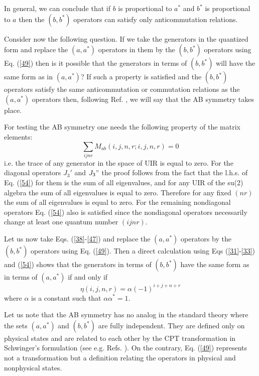 \documentclass[a4paper,12pt]{article}%
\begin{document}
In general, we can conclude that if $b$ is proportional
to $a^*$ and $b^*$ is proportional to $a$ then the
$(b,b^*)$ operators can satisfy only anticommutation
relations.

Consider now the following question. If we take the
generators in the quantized form and 
replace the $(a,a^*)$ operators in them by the
$(b,b^*)$ operators using Eq. (\ref{49}) then is
it possible that the generators in terms of
$(b,b^*)$ will have the same form as in $(a,a^*)$?
If such a property is satisfied and the 
$(b,b^*)$ operators satisfy the same anticommutation 
or commutation relations as the $(a,a^*)$ operators 
then, following Ref. \cite{lev2}, we will say that 
the AB symmetry takes place.

For testing the AB symmetry one needs the following
property of the matrix elements:
\begin{equation}
\sum_{ijnr} M_{ab}(i,j,n,r;i,j,n,r)=0
\label{54}
\end{equation}
i.e. the trace of any generator in the space of UIR
is equal to zero. For the diagonal operators $J_3'$
and $J_3"$ the proof follows from the fact that the
l.h.s. of Eq. (\ref{54}) for them is the sum of all
eigenvalues, and for any UIR
of the su(2) algebra the sum of all eigenvalues is
equal to zero. Therefore for any fixed $(nr)$ the
sum of all eigenvalues is equal to zero. For the
remaining nondiagonal operators Eq. (\ref{54})
also is satisfied since the nondiagonal 
operators necessarily change at least one quantum
number $(ijnr)$. 

Let us now take Eqs. (\ref{38}-\ref{47}) and replace
the $(a,a^*)$ operators by the $(b,b^*)$ operators
using Eq. (\ref{49}). Then a direct calculation using 
Eqs (\ref{31}-\ref{33}) and (\ref{54}) shows that
the generators in terms of $(b,b^*)$ have the same
form as in terms of $(a,a^*)$ if and only if
\begin{equation}
\eta(i,j,n,r)=\alpha (-1)^{i+j+n+r}
\label{55}
\end{equation} 
where $\alpha$ is a constant such that 
$\alpha\alpha^*=1$.

Let us note that the AB symmetry has no analog in the standard
theory where the sets $(a,a^*)$ and $(b,b^*)$ are fully 
independent. They are defined only on physical states and 
are related to each other by the CPT transformation in 
Schwinger's formulation (see e.g. Refs. \cite{Novozhilov,Wein}).  
On the contrary, Eq. (\ref{49}) represents not a 
transformation but a definition relating the operators 
in physical and nonphysical states.
\end{document}
